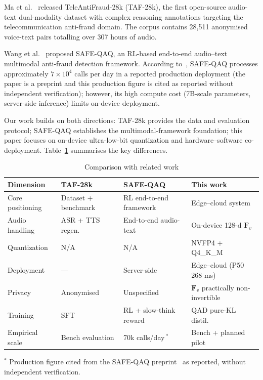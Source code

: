 \documentclass[final,5p,times,number]{elsarticle}
\begin{document}
Ma et al.~\cite{1} released TeleAntiFraud-28k (TAF-28k), the first open-source audio-text dual-modality dataset with complex reasoning annotations targeting the telecommunication anti-fraud domain. The corpus contains 28{,}511 anonymised voice-text pairs totalling over 307 hours of audio.

Wang et al.~\cite{2} proposed SAFE-QAQ, an RL-based end-to-end audio--text multimodal anti-fraud detection framework. According to~\cite{2}, SAFE-QAQ processes approximately $7\times10^4$ calls per day in a reported production deployment (the paper is a preprint and this production figure is cited as reported without independent verification); however, its high compute cost (7B-scale parameters, server-side inference) limits on-device deployment.

Our work builds on both directions: TAF-28k provides the data and evaluation protocol; SAFE-QAQ establishes the multimodal-framework foundation; this paper focuses on on-device ultra-low-bit quantization and hardware--software co-deployment. Table~\ref{tab1} summarises the key differences.

\begin{table}[!t]
\centering\small
\caption{Comparison with related work}
\label{tab1}
\renewcommand{\arraystretch}{1.15}
\setlength{\tabcolsep}{4pt}
\begin{tabular}{>{\raggedright\arraybackslash}p{3.5cm}>{\raggedright\arraybackslash}p{3.5cm}>{\raggedright\arraybackslash}p{5.2cm}>{\raggedright\arraybackslash}p{4.5cm}}
\toprule
\textbf{Dimension} & \textbf{TAF-28k~\cite{1}} & \textbf{SAFE-QAQ~\cite{2}} & \textbf{This work} \\
\midrule
Core positioning & Dataset + benchmark & RL end-to-end framework & Edge--cloud system \\
Audio handling & ASR + TTS regen. & End-to-end audio-text & On-device 128-d $\bm{F}_v$ \\
Quantization & N/A & N/A & NVFP4 + Q4\_K\_M \\
Deployment & --- & Server-side & Edge--cloud (P50 268 ms) \\
Privacy & Anonymised & Unspecified & $\bm{F}_v$ practically non-invertible \\
Training & SFT & RL + slow-think reward & QAD pure-KL distil. \\
Empirical scale & Bench evaluation & 70k calls/day\,$^{\ast}$ & Bench + planned pilot\\
\bottomrule
\end{tabular}

\vspace{2pt}
{\footnotesize $^{\ast}$ Production figure cited from the SAFE-QAQ preprint~\cite{2} as reported, without independent verification.}
\end{table}
\end{document}
